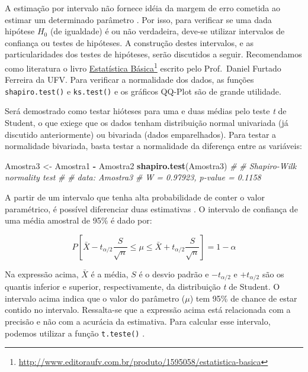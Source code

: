 \documentclass[
]{book}
\newenvironment{Shaded}{\begin{snugshade}}{\end{snugshade}}
\newcommand{\CommentTok}[1]{\textcolor[rgb]{0.56,0.35,0.01}{\textit{#1}}}
\newcommand{\KeywordTok}[1]{\textcolor[rgb]{0.13,0.29,0.53}{\textbf{#1}}}
\newcommand{\NormalTok}[1]{#1}
\newcommand{\OperatorTok}[1]{\textcolor[rgb]{0.81,0.36,0.00}{\textbf{#1}}}
\newcommand{\StringTok}[1]{\textcolor[rgb]{0.31,0.60,0.02}{#1}}
\begin{document}
A estimação por intervalo não fornece idéia da margem de erro cometida ao estimar um determinado parâmetro \citep{Ferreira2009}. Por isso, para verificar se uma dada hipótese \(H_0\) (de igualdade) é ou não verdadeira, deve-se utilizar intervalos de confiança ou testes de hipóteses. A construção destes intervalos, e as particularidades dos testes de hipóteses, serão discutidos a seguir. Recomendamos como literatura o livro \href{http://www.editoraufv.com.br/produto/1595058/estatistica-basica}{Estatística Básica}\footnote{\url{http://www.editoraufv.com.br/produto/1595058/estatistica-basica}} escrito pelo Prof.~Daniel Furtado Ferreira da UFV.
Para verificar a normalidade dos dados, as funções \texttt{shapiro.test()} e \texttt{ks.test()} e os gráficos QQ-Plot são de grande utilidade.  

Será demostrado como testar hióteses para uma e duas médias pelo teste \emph{t} de Student, o que exiege que os dados tenham distribuição normal univariada (já discutido anteriormente) ou bivariada (dados emparelhados). Para testar a normalidade bivariada, basta testar a normalidade da diferença entre as variáveis: 

\begin{Shaded}
\begin{Highlighting}[]
\NormalTok{Amostra3 <-}\StringTok{ }\NormalTok{Amostra1 }\OperatorTok{-}\StringTok{ }\NormalTok{Amostra2}
\KeywordTok{shapiro.test}\NormalTok{(Amostra3)}
\CommentTok{# }
\CommentTok{# 	Shapiro-Wilk normality test}
\CommentTok{# }
\CommentTok{# data:  Amostra3}
\CommentTok{# W = 0.97923, p-value = 0.1158}
\end{Highlighting}
\end{Shaded}

A partir de um intervalo  que tenha alta probabilidade de conter o valor paramétrico, é possível diferenciar duas estimativas \citep{Ferreira2009}. O intervalo de confiança de uma média amostral de 95\% é dado por:

\[
P\left[ {\bar X - {t_{\alpha /2}}\frac{S}{{\sqrt n }} \le \mu  \le \bar X + {t_{\alpha /2}}\frac{S}{{\sqrt n }}} \right] = 1 - \alpha 
\]

Na expressão acima, \(\bar X\) é a média, \(S\) é o desvio padrão e \(-t_{\alpha /2}\) e \(+t_{\alpha /2}\) são os quantis inferior e superior, respectivamente, da distribuição \emph{t} de Student. O intervalo acima indica que o valor do parâmetro (\(\mu\)) tem 95\% de chance de estar contido no intervalo. Ressalta-se que a expressão acima está relacionada com a precisão e não com a acurácia da estimativa. Para calcular esse intervalo, podemos utilizar a função \texttt{t.teste()} .
\end{document}
